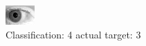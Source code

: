 \begin{figure}[h!]
\begin{center}
\includegraphics[width=0.60\columnwidth]{figures/ID241_class_4_target_3.png}
\end{center}
\caption{ Classification: 4 actual target: 3}
\label{fig:ID241_class_4_target_3}
\end{figure}
